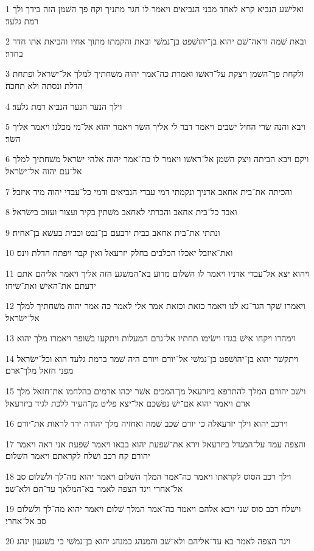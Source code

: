 \par 1 ואלישׁע הנביא קרא לאחד מבני הנביאים ויאמר לו חגר מתניך וקח פך השׁמן הזה בידך ולך רמת גלעד׃
\par 2 ובאת שׁמה וראה־שׁם יהוא בן־יהושׁפט בן־נמשׁי ובאת והקמתו מתוך אחיו והביאת אתו חדר בחדר׃
\par 3 ולקחת פך־השׁמן ויצקת על־ראשׁו ואמרת כה־אמר יהוה משׁחתיך למלך אל־ישׂראל ופתחת הדלת ונסתה ולא תחכה׃
\par 4 וילך הנער הנער הנביא רמת גלעד׃
\par 5 ויבא והנה שׂרי החיל ישׁבים ויאמר דבר לי אליך השׂר ויאמר יהוא אל־מי מכלנו ויאמר אליך השׂר׃
\par 6 ויקם ויבא הביתה ויצק השׁמן אל־ראשׁו ויאמר לו כה־אמר יהוה אלהי ישׂראל משׁחתיך למלך אל־עם יהוה אל־ישׂראל׃
\par 7 והכיתה את־בית אחאב אדניך ונקמתי דמי עבדי הנביאים ודמי כל־עבדי יהוה מיד איזבל׃
\par 8 ואבד כל־בית אחאב והכרתי לאחאב משׁתין בקיר ועצור ועזוב בישׂראל׃
\par 9 ונתתי את־בית אחאב כבית ירבעם בן־נבט וכבית בעשׁא בן־אחיה׃
\par 10 ואת־איזבל יאכלו הכלבים בחלק יזרעאל ואין קבר ויפתח הדלת וינס׃
\par 11 ויהוא יצא אל־עבדי אדניו ויאמר לו השׁלום מדוע בא־המשׁגע הזה אליך ויאמר אליהם אתם ידעתם את־האישׁ ואת־שׂיחו׃
\par 12 ויאמרו שׁקר הגד־נא לנו ויאמר כזאת וכזאת אמר אלי לאמר כה אמר יהוה משׁחתיך למלך אל־ישׂראל׃
\par 13 וימהרו ויקחו אישׁ בגדו וישׂימו תחתיו אל־גרם המעלות ויתקעו בשׁופר ויאמרו מלך יהוא׃
\par 14 ויתקשׁר יהוא בן־יהושׁפט בן־נמשׁי אל־יורם ויורם היה שׁמר ברמת גלעד הוא וכל־ישׂראל מפני חזאל מלך־ארם׃
\par 15 וישׁב יהורם המלך להתרפא ביזרעאל מן־המכים אשׁר יכהו ארמים בהלחמו את־חזאל מלך ארם ויאמר יהוא אם־ישׁ נפשׁכם אל־יצא פליט מן־העיר ללכת לגיד ביזרעאל׃
\par 16 וירכב יהוא וילך יזרעאלה כי יורם שׁכב שׁמה ואחזיה מלך יהודה ירד לראות את־יורם׃
\par 17 והצפה עמד על־המגדל ביזרעאל וירא את־שׁפעת יהוא בבאו ויאמר שׁפעת אני ראה ויאמר יהורם קח רכב ושׁלח לקראתם ויאמר השׁלום׃
\par 18 וילך רכב הסוס לקראתו ויאמר כה־אמר המלך השׁלום ויאמר יהוא מה־לך ולשׁלום סב אל־אחרי ויגד הצפה לאמר בא־המלאך עד־הם ולא־שׁב׃
\par 19 וישׁלח רכב סוס שׁני ויבא אלהם ויאמר כה־אמר המלך שׁלום ויאמר יהוא מה־לך ולשׁלום סב אל־אחרי׃
\par 20 ויגד הצפה לאמר בא עד־אליהם ולא־שׁב והמנהג כמנהג יהוא בן־נמשׁי כי בשׁגעון ינהג׃
